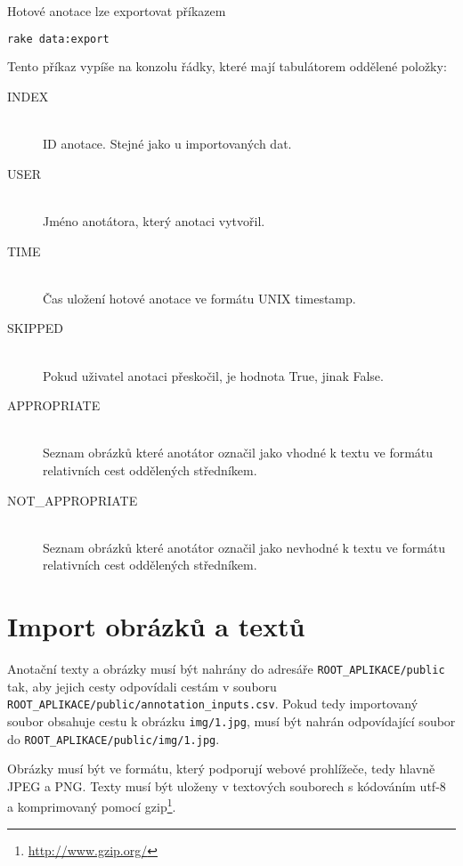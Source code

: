 Hotové anotace lze exportovat příkazem

\begin{lstlisting}[language=bash]
rake data:export
\end{lstlisting}

Tento příkaz vypíše na konzolu řádky, které mají tabulátorem oddělené položky:

\begin{description}

\item[INDEX] \hfill \\
  ID anotace. Stejné jako u importovaných dat.
\item[USER] \hfill \\
  Jméno anotátora, který anotaci vytvořil.
\item[TIME] \hfill \\
  Čas uložení hotové anotace ve formátu UNIX timestamp.
\item[SKIPPED] \hfill \\
  Pokud uživatel anotaci přeskočil, je hodnota True, jinak False.
\item[APPROPRIATE] \hfill \\
  Seznam obrázků které anotátor označil jako vhodné k textu ve formátu relativních cest oddělených středníkem.
\item[NOT\_APPROPRIATE] \hfill \\
  Seznam obrázků které anotátor označil jako nevhodné k textu ve formátu relativních cest oddělených středníkem.

\end{description}

\section{Import obrázků a textů}

Anotační texty a obrázky musí být nahrány do adresáře \lstinline{ROOT_APLIKACE/public} tak, aby jejich cesty odpovídali cestám v souboru \\ \lstinline{ROOT_APLIKACE/public/annotation_inputs.csv}. Pokud tedy importovaný soubor obsahuje cestu k obrázku \lstinline{img/1.jpg}, musí být nahrán odpovídající soubor do \lstinline{ROOT_APLIKACE/public/img/1.jpg}.

Obrázky musí být ve formátu, který podporují webové prohlížeče, tedy hlavně JPEG a PNG. Texty musí být uloženy v textových souborech s kódováním utf-8 a komprimovaný pomocí gzip\footnote{\url{http://www.gzip.org/}}.



